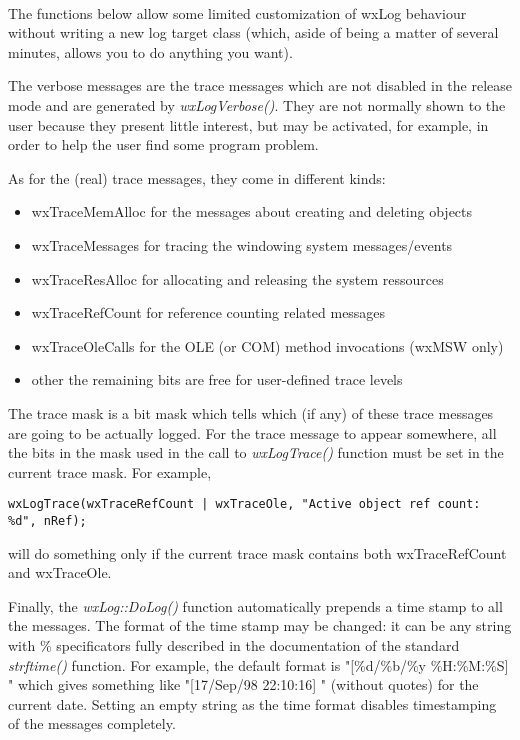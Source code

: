 \\

\label{wxlogcustomization}

The functions below allow some limited customization of wxLog behaviour
without writing a new log target class (which, aside of being a matter of
several minutes, allows you to do anything you want).

The verbose messages are the trace messages which are not disabled in the
release mode and are generated by {\it wxLogVerbose()}. They are not normally
shown to the user because they present little interest, but may be activated,
for example, in order to help the user find some program problem.

As for the (real) trace messages, they come in different kinds:

\begin{itemize}\itemsep=0pt
\item{wxTraceMemAlloc} for the messages about creating and deleting objects
\item{wxTraceMessages} for tracing the windowing system messages/events
\item{wxTraceResAlloc} for allocating and releasing the system ressources
\item{wxTraceRefCount} for reference counting related messages
\item{wxTraceOleCalls} for the OLE (or COM) method invocations (wxMSW only)
\item{other} the remaining bits are free for user-defined trace levels
\end{itemize}

The trace mask is a bit mask which tells which (if any) of these trace
messages are going to be actually logged. For the trace message to appear
somewhere, all the bits in the mask used in the call to {\it wxLogTrace()}
function must be set in the current trace mask. For example,
\begin{verbatim}
wxLogTrace(wxTraceRefCount | wxTraceOle, "Active object ref count: %d", nRef);
\end{verbatim}
will do something only if the current trace mask contains both wxTraceRefCount
and wxTraceOle.

Finally, the {\it wxLog::DoLog()} function automatically prepends a time stamp
to all the messages. The format of the time stamp may be changed: it can be
any string with \% specificators fully described in the documentation of the
standard {\it strftime()} function. For example, the default format is
"[\%d/\%b/\%y \%H:\%M:\%S] " which gives something like "[17/Sep/98 22:10:16] "
(without quotes) for the current date. Setting an empty string as the time
format disables timestamping of the messages completely.

